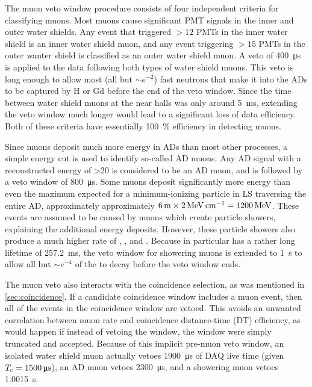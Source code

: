 The muon veto window procedure consists of four independent criteria
for classifying muons.
Most muons cause significant PMT signals in the inner and outer water shields.
Any event that triggered $>12$ PMTs in the inner water shield
is an inner water shield muon,
and any event triggering $>15$ PMTs in the outer wanter shield
is classified as an outer water shield muon.
A veto of \SI{400}{\micro\second} is applied to the data following
both types of water shield muons.
This veto is long enough to allow most (all but $\sim e^{-2}$)
fast neutrons that make it into the ADs to be captured by H or Gd
before the end of the veto window.
Since the time between water shield muons at the near halls
was only around \SI{5}{\milli\second},
extending the veto window much longer would lead to a significant
loss of data efficiency.
Both of these criteria have essentially \SI{100}{\percent} efficiency
in detecting muons.

Since muons deposit much more energy in ADs than most other processes,
a simple energy cut is used to identify so-called AD muons.
Any AD signal with a reconstructed energy of \SI{>20}{\mev}
is considered to be an AD muon, and is followed by a veto window
of \SI{800}{\micro\second}.
Some muons deposit significantly more energy than
even the maximum expected for a minimum-ionizing particle in LS
traversing the entire AD, approximately
approximately $\SI{6}{\meter}\times\SI{2}{\mev\per\cm}=\SI{1200}{\mev}$.
These events are assumed to be caused by muons which create particle showers,
explaining the additional energy deposits.
However, these particle showers also produce a much higher rate of
\li, \he, and \boron.
Because \li{} in particular has a rather long lifetime of \SI{257.2}{\milli\second},
the veto window for showering muons is extended to \SI{1}{\second}
to allow all but $\sim e^{-4}$ of the \li{} to decay before the veto window ends.

The muon veto also interacts with the coincidence selection,
as was mentioned in \cref{sec:coincidence}.
If a candidate coincidence window includes a muon event,
then all of the events in the coincidence window are vetoed.
This avoids an unwanted correlation between muon rate
and coincidence distance-time (DT) efficiency,
as would happen if instead of vetoing the window,
the window were simply truncated and accepted.
Because of this implicit pre-muon veto window,
an isolated water shield muon actually vetoes \SI{1900}{\micro\second}
of DAQ live time (given $T_c=\SI{1500}{\micro\second}$),
an AD muon vetoes \SI{2300}{\micro\second},
and a showering muon vetoes \SI{1.0015}{\second}.

